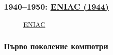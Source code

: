 \documentclass[ignorenonframetext, hyperref=unicode]{beamer}
\begin{document}
\begin{frame}
\frametitle{1940--1950: 
\href{http://en.wikipedia.org/wiki/ENIAC}{ENIAC (1944)}}
\begin{figure}[h]
\center
{}
\caption{\href{http://en.wikipedia.org/wiki/Image:Classic_shot_of_the_ENIAC.jpg}{ENIAC}}
\end{figure}
\end{frame}

\subsubsection{Първо поколение компютри}
\end{document}
